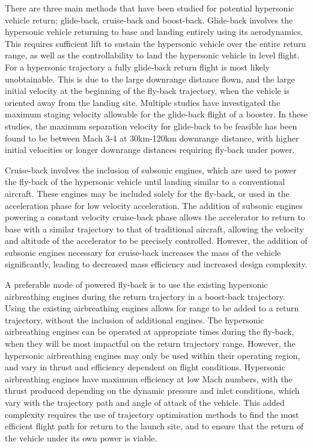 There are three main methods that have been studied for potential hypersonic vehicle return; glide-back, cruise-back and boost-back. Glide-back involves the hypersonic vehicle returning to base and landing entirely using its aerodynamics. This requires sufficient lift to sustain the hypersonic vehicle over the entire return range, as well as the controllability to land the hypersonic vehicle in level flight. 
For a hypersonic trajectory a fully glide-back return flight is most likely unobtainable. This is due to the large downrange distance flown, and the large initial velocity at the beginning of the fly-back trajectory, when the vehicle is oriented away from the landing site. Multiple studies have investigated the maximum staging velocity allowable for the glide-back flight of a booster. 
In these studies, the maximum separation velocity for glide-back to be feasible has been found to be between Mach 3-4 at 30km-120km downrange distance, with higher initial velocities or longer downrange distances requiring fly-back under power\cite{Hellman,Tetlow1992}.

Cruise-back involves the inclusion of subsonic engines, which are used to power the fly-back of the hypersonic vehicle until landing similar to a conventional aircraft. These engines may be included solely for the fly-back\cite{Hellman}, or used in the acceleration phase for low velocity acceleration\cite{Mehta2001,Tetlow1992,Wilhite1991}. The addition of subsonic engines powering a constant velocity cruise-back phase allows the accelerator to return to base with a similar trajectory to that of traditional aircraft, allowing the velocity and altitude of the accelerator to be precisely controlled. However, the addition of subsonic engines necessary for cruise-back increases the mass of the vehicle significantly, leading to decreased mass efficiency and increased design complexity\cite{Hellman}. 

A preferable mode of powered fly-back is to use the existing hypersonic airbreathing engines during the return trajectory in a boost-back trajectory. Using the existing airbreathing engines allows for range to be added to a return trajectory, without the inclusion of additional engines. The hypersonic airbreathing engines can be operated at appropriate times during the fly-back, when they will be most impactful on the return trajectory range. However, the hypersonic airbreathing engines may only be used within their operating region, and vary in thrust and efficiency dependent on flight conditions. Hypersonic airbreathing engines have maximum efficiency at low Mach numbers\cite{Preller2017}, with the thrust produced depending on the dynamic pressure and inlet conditions, which vary with the trajectory path and angle of attack of the vehicle. This added complexity requires the use of trajectory optimisation methods to find the most efficient flight path for return to the launch site, and to ensure that the return of the vehicle under its own power is viable. 


